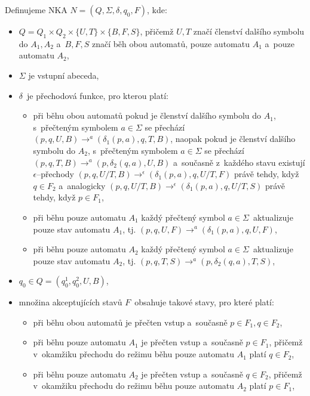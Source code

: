\documentclass[a4paper, 11pt]{article}
\begin{document}
Definujeme NKA $N = \left( Q, \Sigma, \delta, q_0, F \right)$, kde:

\begin{itemize}
    \item $Q = Q_1 \times Q_2 \times \{ U, T \} \times \{ B, F, S \}$, přičemž $U, T$ značí členství dalšího symbolu do $A_1, A_2$ a~$B, F, S$ značí běh obou automatů, pouze automatu $A_1$ a~pouze automatu $A_2$,
    \item $\Sigma$ je vstupní abeceda,
    \item $\delta$~je přechodová funkce, pro kterou platí:
    \begin{itemize}
        \item při běhu obou automatů pokud je členství dalšího symbolu do $A_1$, s~přečteným symbolem $a \in \Sigma$ se přechází $\left( p, q, U, B \right) \rightarrow^a \left( \delta_1\left( p, a \right), q, T, B \right)$, naopak pokud je členství dalšího symbolu do $A_2$, s~přečteným symbolem $a \in \Sigma$ se přechází $\left( p, q, T, B \right) \rightarrow^a \left( p, \delta_2\left( q, a \right), U, B \right)$ a~současně z~každého stavu existují $\epsilon$--přechody $\left( p, q, U / T, B \right) \rightarrow^\epsilon \left( \delta_1\left( p, a \right), q, U / T, F \right)$ právě tehdy, když $q \in F_2$ a~analogicky $\left( p, q, U / T, B \right) \rightarrow^\epsilon \left( \delta_1\left( p, a \right), q, U / T, S \right)$ právě tehdy, když $p \in F_1$,
        \item při běhu pouze automatu $A_1$ každý přečtený symbol $a \in \Sigma$~aktualizuje pouze stav automatu $A_1$, tj. $\left( p, q, U, F \right) \rightarrow^a \left( \delta_1\left( p, a \right), q, U, F \right)$,
        \item při běhu pouze automatu $A_2$ každý přečtený symbol $a \in \Sigma$~aktualizuje pouze stav automatu $A_2$, tj. $\left( p, q, T, S \right) \rightarrow^a \left( p, \delta_2\left( q, a \right), T, S \right)$,
    \end{itemize}
    \item $q_0 \in Q = \left( q_0^1, q_0^2, U, B \right)$,
    \item množina akceptujících stavů $F$~obsahuje takové stavy, pro které platí:
    \begin{itemize}
        \item při běhu obou automatů je přečten vstup a~současně $p \in F_1, q \in F_2$,
        \item při běhu pouze automatu $A_1$ je přečten vstup a~současně $p \in F_1$, přičemž v~okamžiku přechodu do režimu běhu pouze automatu $A_1$ platí $q \in F_2$,
        \item při běhu pouze automatu $A_2$ je přečten vstup a~současně $q \in F_2$, přičemž v~okamžiku přechodu do režimu běhu pouze automatu $A_2$ platí $p \in F_1$,
    \end{itemize}
\end{itemize}
\end{document}
